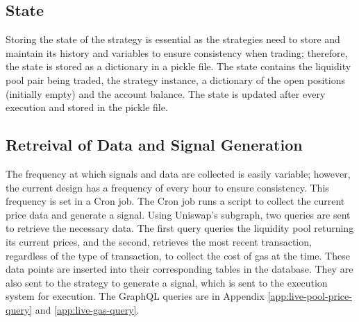 \subsection{State}
Storing the state of the strategy is essential as the strategies need to store and maintain its history and variables to ensure consistency when trading; therefore, the state is stored as a dictionary in a pickle file. The state contains the liquidity pool pair being traded, the strategy instance, a dictionary of the open positions (initially empty) and the account balance. The state is updated after every execution and stored in the pickle file.

\subsection{Retreival of Data and Signal Generation}
The frequency at which signals and data are collected is easily variable; however, the current design has a frequency of every hour to ensure consistency. This frequency is set in a Cron job. The Cron job runs a script to collect the current price data and generate a signal. Using Uniswap's subgraph, two queries are sent to retrieve the necessary data. The first query queries the liquidity pool returning its current prices, and the second, retrieves the most recent transaction, regardless of the type of transaction, to collect the cost of gas at the time. These data points are inserted into their corresponding tables in the database. They are also sent to the strategy to generate a signal, which is sent to the execution system for execution. The GraphQL queries are in Appendix \ref{app:live-pool-price-query} and \ref{app:live-gas-query}.

